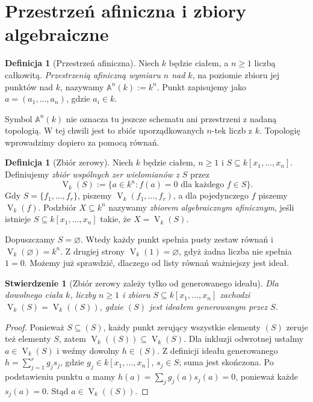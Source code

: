 \documentclass[11pt,a4paper,openany]{report}
\numberwithin{equation}{section}
\theoremstyle{plain}
\newtheorem{stwierdzenie}[twierdzenie]{Stwierdzenie}
\theoremstyle{definition}
\newtheorem{definicja}[twierdzenie]{Definicja}
\theoremstyle{remark}
\newcommand{\A}{\mathbb A}
\newcommand{\V}{\operatorname V}
\begin{document}
\section{Przestrzeń afiniczna i zbiory algebraiczne}

\begin{definicja}[Przestrzeń afiniczna]
Niech $k$ będzie ciałem, a $n\ge1$ liczbą całkowitą. \emph{Przestrzenią
afiniczną wymiaru $n$ nad $k$}, na poziomie zbioru jej punktów nad $k$,
nazywamy $\A^n(k):=k^n$. Punkt zapisujemy jako
$a=(a_1,\dots,a_n)$, gdzie $a_i\in k$.
\end{definicja}

Symbol $\A^n(k)$ nie oznacza tu jeszcze schematu ani przestrzeni z nadaną
topologią. W tej chwili jest to zbiór uporządkowanych $n$-tek liczb z $k$.
Topologię wprowadzimy dopiero za pomocą równań.

\begin{definicja}[Zbiór zerowy]
Niech $k$ będzie ciałem, $n\ge1$ i $S\subseteq k[x_1,\dots,x_n]$.
Definiujemy \emph{zbiór wspólnych zer wielomianów z $S$} przez
\[
\V_k(S):=\{a\in k^n: f(a)=0\text{ dla każdego }f\in S\}.
\]
Gdy $S=\{f_1,\dots,f_r\}$, piszemy
$\V_k(f_1,\dots,f_r)$, a dla pojedynczego $f$ piszemy $\V_k(f)$.
Podzbiór $X\subseteq k^n$ nazywamy \emph{zbiorem algebraicznym afinicznym},
jeśli istnieje $S\subseteq k[x_1,\dots,x_n]$ takie, że $X=\V_k(S)$.
\end{definicja}

Dopuszczamy $S=\varnothing$. Wtedy każdy punkt spełnia pusty zestaw
równań i $\V_k(\varnothing)=k^n$. Z drugiej strony
$\V_k(1)=\varnothing$, gdyż żadna liczba nie spełnia $1=0$.
Możemy już sprawdzić, dlaczego od listy równań ważniejszy jest ideał.

\begin{stwierdzenie}[Zbiór zerowy zależy tylko od generowanego ideału]
\label{st:V-ideal}
Dla dowolnego ciała $k$, liczby $n\ge1$ i zbioru
$S\subseteq k[x_1,\dots,x_n]$ zachodzi $\V_k(S)=\V_k((S))$,
gdzie $(S)$ jest ideałem generowanym przez $S$.
\end{stwierdzenie}
\begin{proof}
Ponieważ $S\subseteq(S)$, każdy punkt zerujący wszystkie elementy
$(S)$ zeruje też elementy $S$, zatem $\V_k((S))\subseteq\V_k(S)$.
Dla inkluzji odwrotnej ustalmy $a\in\V_k(S)$ i weźmy dowolny
$h\in(S)$. Z definicji ideału generowanego
$h=\sum_{j=1}^r g_js_j$, gdzie $g_j\in k[x_1,\dots,x_n]$,
$s_j\in S$; suma jest skończona. Po podstawieniu punktu $a$ mamy
$h(a)=\sum_jg_j(a)s_j(a)=0$, ponieważ każde $s_j(a)=0$.
Stąd $a\in\V_k((S))$.
\end{proof}
\end{document}
